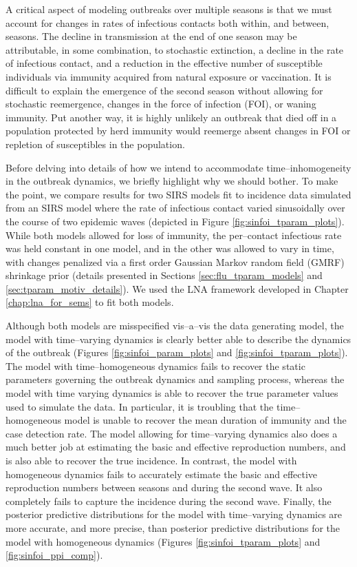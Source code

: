 A critical aspect of modeling outbreaks over multiple seasons is that we must account for changes in rates of infectious contacts both within, and between, seasons. The decline in transmission at the end of one season may be attributable, in some combination, to stochastic extinction, a decline in the rate of infectious contact, and a reduction in the effective number of susceptible individuals via immunity acquired from natural exposure or vaccination. It is difficult to explain the emergence of the second season without allowing for stochastic reemergence, changes in the force of infection (FOI), or waning immunity. Put another way, it is highly unlikely an outbreak that died off in a population protected by herd immunity would reemerge absent changes in FOI or repletion of susceptibles in the population. 

Before delving into details of how we intend to accommodate time--inhomogeneity in the outbreak dynamics, we briefly highlight why we should bother. To make the point, we compare results for two SIRS models fit to incidence data simulated from an SIRS model where the rate of infectious contact varied sinusoidally over the course of two epidemic waves (depicted in Figure \ref{fig:sinfoi_tparam_plots}). While both models allowed for loss of immunity, the per--contact infectious rate was held constant in one model, and in the other was allowed to vary in time, with changes penalized via a first order Gaussian Markov random field (GMRF) shrinkage prior (details presented in Sections \ref{sec:flu_tparam_models} and \ref{sec:tparam_motiv_details}). We used the LNA framework developed in Chapter \ref{chap:lna_for_sems} to fit both models. 

Although both models are misspecified vis--a--vis the  data generating model, the model with time--varying dynamics is clearly better able to describe the dynamics of the outbreak (Figures \ref{fig:sinfoi_param_plots} and \ref{fig:sinfoi_tparam_plots}). The model with time--homogeneous dynamics fails to recover the static parameters governing the outbreak dynamics and sampling process, whereas the model with time varying dynamics is able to recover the true parameter values used to simulate the data. In particular, it is troubling that the time--homogeneous model is unable to recover the mean duration of immunity and the case detection rate. The model allowing for time--varying dynamics also does a much better job at estimating the basic and effective reproduction numbers, and is also able to recover the true incidence. In contrast, the model with homogeneous dynamics fails to accurately estimate the basic and effective reproduction numbers between seasons and during the second wave. It also completely fails to capture the incidence during the second wave. Finally, the posterior predictive distributions for the model with time--varying dynamics are more accurate, and more precise, than posterior predictive distributions for the model with homogeneous dynamics (Figures \ref{fig:sinfoi_tparam_plots} and \ref{fig:sinfoi_ppi_comp}).

